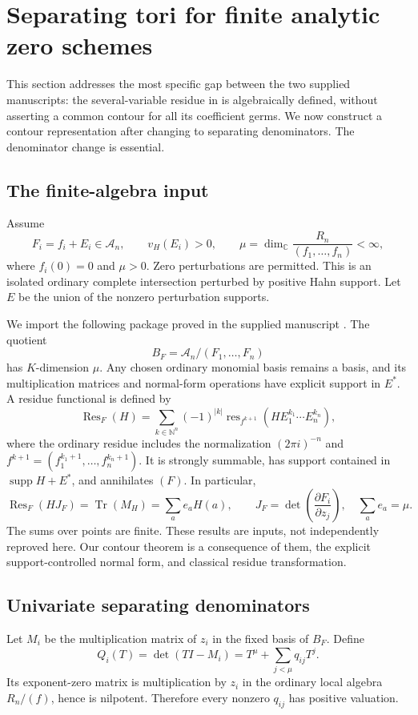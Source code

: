 \documentclass[11pt,letterpaper]{article}
\theoremstyle{definition}
\theoremstyle{remark}
\newcommand{\C}{\mathbb C}
\newcommand{\N}{\mathbb N}
\newcommand{\Acal}{\mathscr A}
\newcommand{\supp}{\operatorname{supp}}
\newcommand{\Res}{\operatorname{Res}}
\newcommand{\res}{\operatorname{res}}
\newcommand{\Tr}{\operatorname{Tr}}
\newcommand{\vH}{v_{\!H}}
\numberwithin{equation}{section}
\begin{document}
\section{Separating tori for finite analytic zero schemes}\label{sec:tori}
This section addresses the most specific gap between the two supplied manuscripts: the several-variable residue in \cite{AG} is algebraically defined, without asserting a common contour for all its coefficient germs. We now construct a contour representation after changing to separating denominators. The denominator change is essential.

\subsection{The finite-algebra input}
Assume
\begin{equation}\label{eq:CI}
F_i=f_i+E_i\in\Acal_n,\qquad \vH(E_i)>0,
\qquad
\mu=\dim_\C\frac{R_n}{(f_1,\ldots,f_n)}<\infty,
\end{equation}
where $f_i(0)=0$ and $\mu>0$. Zero perturbations are permitted. This is an isolated ordinary complete intersection perturbed by positive Hahn support. Let $E$ be the union of the nonzero perturbation supports.

We import the following package proved in the supplied manuscript \cite[\S\S7--9]{AG}. The quotient
\[
B_F=\Acal_n/(F_1,\ldots,F_n)
\]
has $K$-dimension $\mu$. Any chosen ordinary monomial basis remains a basis, and its multiplication matrices and normal-form operations have explicit support in $E^*$. A residue functional is defined by
\begin{equation}\label{eq:AGresidue}
\Res_F(H)=\sum_{k\in\N^n}(-1)^{|k|}
 \res_{f^{k+1}}(H E_1^{k_1}\cdots E_n^{k_n}),
\end{equation}
where the ordinary residue includes the normalization $(2\pi i)^{-n}$ and
$f^{k+1}=(f_1^{k_1+1},\ldots,f_n^{k_n+1})$. It is strongly summable, has support contained in $\supp H+E^*$, and annihilates $(F)$. In particular,
\begin{equation}\label{eq:traceinput}
\Res_F(HJ_F)=\Tr(M_H)=\sum_a e_aH(a),\qquad
J_F=\det\left(\frac{\partial F_i}{\partial z_j}\right),\quad
\sum_a e_a=\mu.
\end{equation}
The sums over points are finite. These results are inputs, not independently reproved here. Our contour theorem is a consequence of them, the explicit support-controlled normal form, and classical residue transformation.

\subsection{Univariate separating denominators}
Let $M_i$ be the multiplication matrix of $z_i$ in the fixed basis of $B_F$. Define
\begin{equation}\label{eq:Qi}
Q_i(T)=\det(TI-M_i)
=T^\mu+\sum_{j<\mu}q_{ij}T^j.
\end{equation}
Its exponent-zero matrix is multiplication by $z_i$ in the ordinary local algebra $R_n/(f)$, hence is nilpotent. Therefore every nonzero $q_{ij}$ has positive valuation.
\end{document}
